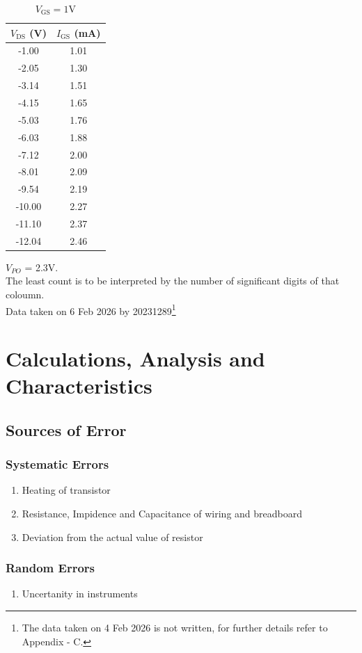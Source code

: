 \documentclass[%
sor,
 jor,
 amsmath,amssymb,
 reprint,
]{revtex4-2}
\begin{document}
\begin{table}[H]
\begin{minipage}{0.30\linewidth}
\begin{center}
\begin{tabular}{|c|c|}
\hline
$V_{\text{DS}}$  (V) & $I_{\text{GS}}$ (mA) \\
\hline
-1.00 & 1.01 \\
-2.05 & 1.30 \\
-3.14 & 1.51\\
-4.15 & 1.65 \\
-5.03 & 1.76 \\
-6.03 & 1.88 \\
-7.12 & 2.00 \\
-8.01 & 2.09 \\
-9.54 & 2.19 \\
-10.00 & 2.27 \\
-11.10 & 2.37 \\
-12.04 & 2.46 \\
\hline
\end{tabular}
\caption{$V_{\text{GS}} = 1\si{\volt}$}
\end{center}
\hfill
\end{minipage}
\end{table}
\begin{center}
	$V_{PO}$ = 2.3V.\\
	The least count is to be interpreted by the number of significant digits of that coloumn.\\
	Data taken on 6 Feb 2026 by 20231289\footnote{The data taken on 4 Feb 2026 is not written, for further details refer to Appendix - C.}
\end{center}

\section{Calculations, Analysis and Characteristics}
\subsection{Sources of Error}
\subsubsection{Systematic Errors}
\begin{enumerate}
	\item Heating of transistor 
	\item Resistance, Impidence and Capacitance of wiring and breadboard
	\item Deviation from the actual value of resistor
\end{enumerate}
\subsubsection{Random Errors}
\begin{enumerate}
	\item Uncertanity in instruments
\end{enumerate}
\end{document}
